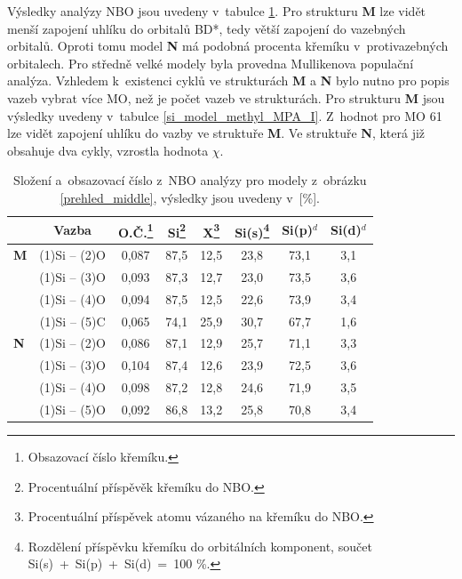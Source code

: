 \documentclass[
digital, %
table,   %
nolof,     %
nolot,     %
oneside,
]{fithesis3}
\begin{document}
Výsledky analýzy NBO jsou uvedeny v~tabulce \ref{nbo_middle}. Pro strukturu \textbf{M} lze vidět menší zapojení uhlíku do orbitalů BD*, tedy větší zapojení do vazebných orbitalů. Oproti tomu model \textbf{N} má podobná procenta křemíku v~protivazebných orbitalech. Pro středně velké modely byla provedna Mullikenova populační analýza. Vzhledem k~existenci cyklů ve strukturách \textbf{M} a \textbf{N} bylo nutno pro popis vazeb vybrat více MO, než je počet vazeb ve strukturách. Pro strukturu \textbf{M} jsou výsledky uvedeny v~tabulce \ref{si_model_methyl_MPA_I}. Z~hodnot pro MO 61 lze vidět zapojení uhlíku do vazby ve struktuře \textbf{M}. Ve struktuře \textbf{N}, která již obsahuje dva cykly, vzrostla hodnota $\chi$.
\begin{table}[H]
\begin{minipage}{\textwidth}
\caption{Složení a~obsazovací číslo z~NBO analýzy pro modely z~obrázku \ref{prehled_middle}, výsledky jsou uvedeny v~[\%].}
\begin{tabular}{|l|c|c|c|c|c|c|c|}
\hline
\label{nbo_middle} &  Vazba & O.Č.\footnote{Obsazovací číslo křemíku.} & Si\footnote{Procentuální příspěvěk křemíku do NBO.} & X\footnote{Procentuální příspěvek atomu vázaného na křemíku do NBO.} & Si(s)\footnote{Rozdělení příspěvku křemíku do orbitálních komponent, součet Si(s)~+~Si(p)~+~Si(d)~=~100 \%.} & Si(p)$^d$ &Si(d)$^d$ \\ \hline
\textbf{M} & (1)Si -- (2)O & 0,087 & 87,5  & 12,5  & 23,8  & 73,1  & 3,1  \\ \hline
& (1)Si -- (3)O & 0,093 & 87,3  & 12,7  & 23,0  & 73,5  & 3,6  \\ \hline
&(1)Si -- (4)O & 0,094 & 87,5  & 12,5  & 22,6  & 73,9  & 3,4  \\ \hline
& (1)Si -- (5)C & 0,065 & 74,1  & 25,9  & 30,7  & 67,7  & 1,6  \\ \hline
\textbf{N} & (1)Si -- (2)O & 0,086 & 87,1  & 12,9  & 25,7  & 71,1  & 3,3  \\ \hline
& (1)Si -- (3)O & 0,104 & 87,4  & 12,6  & 23,9  & 72,5  & 3,6  \\ \hline
& (1)Si -- (4)O & 0,098 & 87,2  & 12,8  & 24,6  & 71,9  & 3,5  \\ \hline
& (1)Si -- (5)O & 0,092 & 86,8  & 13,2  & 25,8  & 70,8  & 3,4  \\ \hline
\end{tabular}
\end{minipage}
\end{table}
\end{document}
